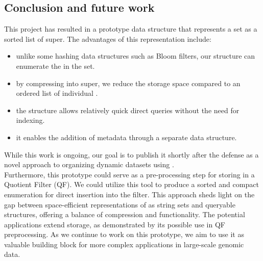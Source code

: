 \subsection{Conclusion and future work}
This project has resulted in a prototype data structure that represents a \kmer set as a sorted list of super\kmers. The advantages of this representation include:
\begin{itemize}
	\item unlike some hashing data structures such as Bloom filters, our structure can enumerate the \kmers in the set.
	\item by compressing \kmers into super\kmers, we reduce the storage space compared to an ordered list of individual \kmers.
	\item the structure allows relatively quick direct queries without the need for indexing.
	\item it enables the addition of metadata through a separate data structure.
\end{itemize}
While this work is ongoing, our goal is to publish it shortly after the defense as a novel approach to organizing dynamic datasets using \kmers.\\
Furthermore, this prototype could serve as a pre-processing step for storing \kmers in a Quotient Filter (QF). We could utilize this tool to produce a sorted and compact \kmer enumeration for direct insertion into the filter.
This approach sheds light on the gap between space-efficient representations of \kmers as string sets and queryable structures, offering a balance of compression and functionality. The potential applications extend storage, as demonstrated by its possible use in QF preprocessing. As we continue to work on this prototype, we aim to use it as valuable building block for more complex applications in large-scale genomic data.

